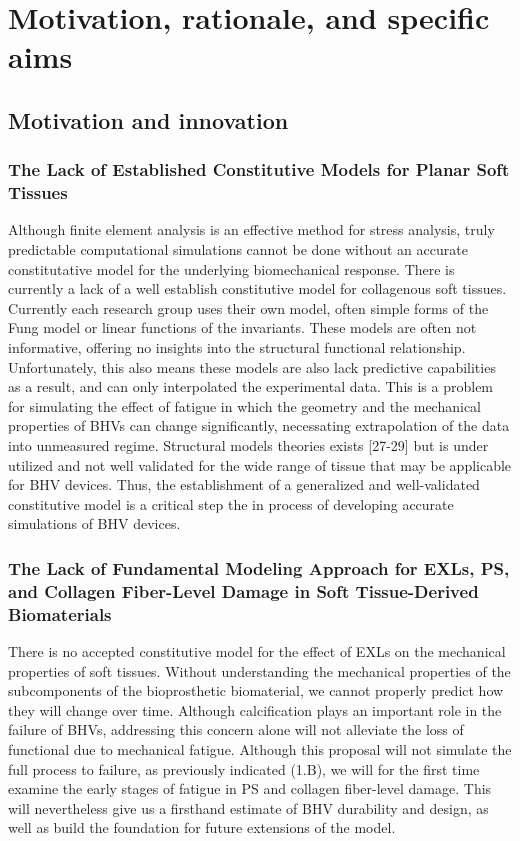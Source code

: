 \section{Motivation, rationale, and specific aims}

\subsection{Motivation and innovation}

\subsubsection{The Lack of Established Constitutive Models for Planar Soft Tissues}
    Although finite element analysis is an effective method for stress analysis, truly predictable computational simulations cannot be done without an accurate constitutative model for the underlying biomechanical response. There is currently a lack of a well establish constitutive model for collagenous soft tissues. Currently each research group uses their own model, often simple forms of the Fung model or linear functions of the invariants. These models are often not informative, offering no insights into the structural functional relationship. Unfortunately, this also means these models are also lack predictive capabilities as a result, and can only interpolated the experimental data. This is a problem for simulating the effect of fatigue in which the geometry and the mechanical properties of BHVs can change significantly, necessating extrapolation of the data into unmeasured regime. Structural models theories exists [27-29] but is under utilized and not well validated for the wide range of tissue that may be applicable for BHV devices. Thus, the establishment of a generalized and well-validated constitutive model is a critical step the in process of developing accurate simulations of BHV devices.

\subsubsection{The Lack of Fundamental Modeling Approach for EXLs, PS, and Collagen Fiber-Level Damage in Soft Tissue-Derived Biomaterials}

    There is no accepted constitutive model for the effect of EXLs on the mechanical properties of soft tissues. Without understanding the mechanical properties of the subcomponents of the bioprosthetic biomaterial, we cannot properly predict how they will change over time. Although calcification plays an important role in the failure of BHVs, addressing this concern alone will not alleviate the loss of functional due to mechanical fatigue. Although this proposal will not simulate the full process to failure, as previously indicated (1.B), we will for the first time examine the early stages of fatigue in PS and collagen fiber-level damage. This will nevertheless give us a firsthand estimate of BHV durability and design, as well as build the foundation for future extensions of the model.

